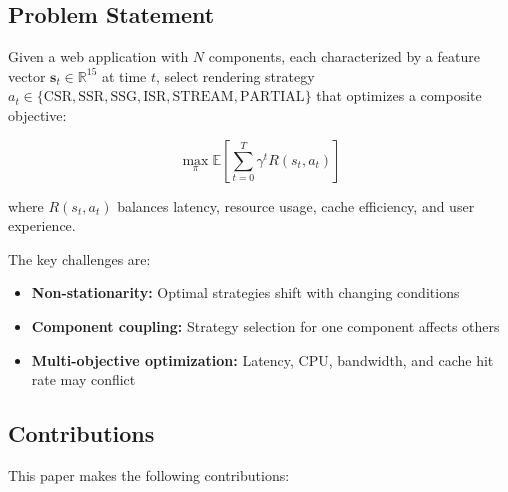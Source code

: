 \documentclass[10pt,twocolumn]{article}
\newcommand{\reals}{\mathbb{R}}
\begin{document}
\subsection{Problem Statement}

Given a web application with $N$ components, each characterized by a feature vector $\mathbf{s}_t \in \reals^{15}$ at time $t$, select rendering strategy $a_t \in \{\text{CSR}, \text{SSR}, \text{SSG}, \text{ISR}, \text{STREAM}, \text{PARTIAL}\}$ that optimizes a composite objective:

\begin{equation}
\max_{\pi} \mathbb{E}\left[\sum_{t=0}^{T} \gamma^t R(s_t, a_t)\right]
\end{equation}

where $R(s_t, a_t)$ balances latency, resource usage, cache efficiency, and user experience.

The key challenges are:
\begin{itemize}[nosep]
\item \textbf{Non-stationarity:} Optimal strategies shift with changing conditions
\item \textbf{Component coupling:} Strategy selection for one component affects others
\item \textbf{Multi-objective optimization:} Latency, CPU, bandwidth, and cache hit rate may conflict
\end{itemize}

\subsection{Contributions}

This paper makes the following contributions:
\end{document}

